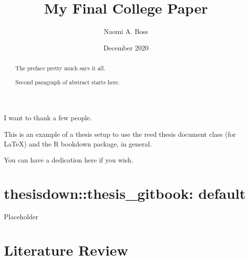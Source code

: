\documentclass[12pt,twoside]{reedthesis}
\title{My Final College Paper}
\author{Naomi A. Boss}
\date{December 2020}
\begin{document}
  \maketitle

\frontmatter %
\pagestyle{empty} %
  \begin{acknowledgements}
    I want to thank a few people.
  \end{acknowledgements}
  \begin{preface}
    This is an example of a thesis setup to use the reed thesis document class
    (for LaTeX) and the R bookdown package, in general.
  \end{preface}
  \hypersetup{linkcolor=black}
  \setcounter{tocdepth}{2}
  \tableofcontents

  \listoftables

  \listoffigures
  \begin{abstract}
    The preface pretty much says it all.
    
    \par
    
    Second paragraph of abstract starts here.
  \end{abstract}
  \begin{dedication}
    You can have a dedication here if you wish.
  \end{dedication}
\mainmatter %
\pagestyle{fancyplain} %

\hypertarget{thesisdownthesis_gitbook-default}{%
\chapter{thesisdown::thesis\_gitbook: default}\label{thesisdownthesis_gitbook-default}}

Placeholder

\hypertarget{lit-review}{%
\chapter{Literature Review}\label{lit-review}}
\end{document}
